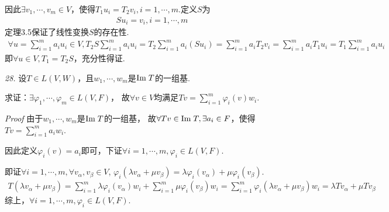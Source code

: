因此\(\exists v_1,\cdots,v_m \in V\)，使得\(T_1u_i=T_2v_i,i=1,\cdots,m\).定义\(S\)为
    \begin{align*}
        Su_i=v_i,i=1,\cdots,m
    \end{align*}
定理3.5保证了线性变换\(S\)的存在性.
    \begin{align*}
        \forall u=\sum_{i=1}^m a_iu_i \in V,T_2S\sum_{i=1}^m a_iu_i=T_2\sum_{i=1}^m a_i(Su_i)
        =\sum_{i=1}^m a_iT_2v_i=\sum_{i=1}^m a_iT_1u_i=T_1\sum_{i=1}^m a_iu_i
    \end{align*}
即\(\forall u \in V , T_1=T_2S\)，充分性得证.

\hspace*{\fill}

\begin{comment}
    \textit{26.}
    设\(D \in L(P(R))\)对于其中任意的多项式\(p\)满足\(\mydeg Dp=\mydeg p-1\).

    求证：\(D\)是满射变换.

    \textit{Proof}
    根据\textit{3.B.10}，命题等价于
        \begin{align*}
            \myspan (D(x),D(x^2),\cdots)=\Img D=P(R)=\myspan (1,x,\cdots)
        \end{align*}
    根据\textit{2.C.10}，由于\(\mydeg Dp=\mydeg p-1\)，

    故\(\myspan (D(x),D(x^2),\cdots)=\myspan (1,x,\cdots)\)成立.
\end{comment}

\textit{28.}
设\(T \in L(V,W)\)，且\(w_1,\cdots,w_m\)是\(\mathrm{Im \;} T\)的一组基.

求证：\(\exists \varphi_1,\cdots,\varphi_m \in L(V,F)\)，
故\(\forall v \in V\)均满足\(Tv=\sum_{i=1}^m{\varphi_i(v)w_i}\).

\textit{Proof}
由于\(w_1,\cdots,w_m\)是\(\mathrm{Im \;} T\)的一组基，
故\(\forall Tv \in \mathrm{Im \;} T,\exists a_i \in F\)，使得\(Tv=\sum_{i=1}^m a_iw_i\).

因此定义\(\varphi_i(v)=a_i\)即可，下证\(\forall i=1,\cdots,m,\varphi_i \in L(V,F)\).

即证\(\forall i=1,\cdots,m,\forall v_\alpha,v_\beta \in V\),
\(\varphi_i(\lambda v_\alpha+\mu v_\beta)=\lambda \varphi_i(v_\alpha)+\mu \varphi_i(v_\beta)\).
    \begin{align*}
        T(\lambda v_\alpha+\mu v_\beta)=\sum_{i=1}^m \lambda \varphi_i(v_\alpha)w_i+\sum_{i=1}^m \mu \varphi_i(v_\beta)w_i
        =\sum_{i=1}^m \varphi_i(\lambda v_\alpha+\mu v_\beta)w_i=\lambda Tv_\alpha+\mu Tv_\beta
    \end{align*}
综上，\(\forall i=1,\cdots,m,\varphi_i \in L(V,F)\).

